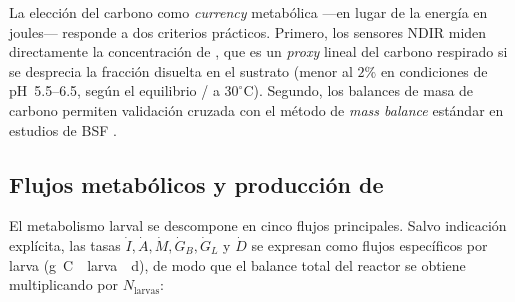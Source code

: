La elección del carbono como \emph{currency} metabólica ---en lugar de la energía en joules--- responde a dos criterios prácticos. Primero, los sensores NDIR miden directamente la concentración de , que es un \emph{proxy} lineal del carbono respirado si se desprecia la fracción disuelta en el sustrato (menor al $2\%$ en condiciones de pH~5.5--6.5, según el equilibrio / a $30^{\circ}$C). Segundo, los balances de masa de carbono permiten validación cruzada con el método de \emph{mass balance} estándar en estudios de BSF \parencite{parodiBioconversionEfficienciesGreenhouse2020a,rossiEstimatingDynamicsGreenhouse2024a}.

\subsection{Flujos metabólicos y producción de \texorpdfstring{}{CO2}}
\label{subsec:cap3_flujos}

El metabolismo larval se descompone en cinco flujos principales. Salvo indicación explícita, las tasas $\dot{I}, \dot{A}, \dot{M}, \dot{G}_B, \dot{G}_L$ y $\dot{D}$ se expresan como flujos específicos por larva (\si{\gram C \per larva \per \day}), de modo que el balance total del reactor se obtiene multiplicando por $N_{\mathrm{larvas}}$:

